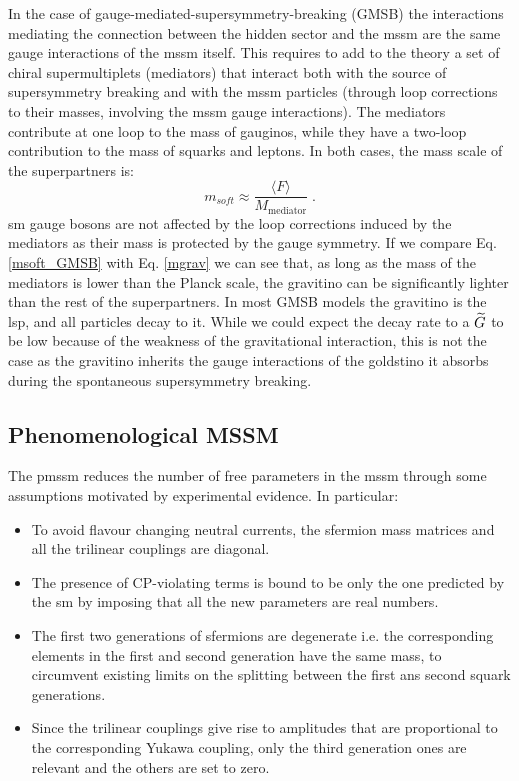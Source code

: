 In the case of gauge-mediated-supersymmetry-breaking (GMSB) \cite{Dine:1981gu, AlvarezGaume:1981wy, Nappi:1982hm, PhysRevD.48.1277, Dine:1994vc, Dine:1995ag} the interactions mediating the connection between the hidden sector and the \gls{mssm} are the same gauge interactions of the \gls{mssm} itself. This requires to add to the theory a set of chiral supermultiplets (mediators) that interact both with the source of supersymmetry breaking and with the \gls{mssm} particles (through loop corrections to their masses, involving the \gls{mssm} gauge interactions). The mediators contribute at one loop to the mass of gauginos, while they have a two-loop contribution to the mass of squarks and leptons. In both cases, the mass scale of the superpartners is:
\begin{equation}
m_{soft} \approx \frac{\langle F \rangle}{M_\mathrm{mediator}} \; .
\label{msoft_GMSB}
\end{equation}
\gls{sm} gauge bosons are not affected by the loop corrections induced by the mediators as their mass is protected by the gauge symmetry.
If we compare Eq. \ref{msoft_GMSB} with Eq. \ref{mgrav} we can see that, as long as the mass of the mediators is lower than the Planck scale, the gravitino can be significantly lighter than the rest of the superpartners. In most GMSB models the gravitino is the \gls{lsp}, and all particles decay to it. While we could expect the decay rate to a $\widetilde{G}$ to be low because of the weakness of the gravitational interaction, this is not the case as the gravitino inherits the gauge interactions of the goldstino it absorbs during the spontaneous supersymmetry breaking.  


\subsection{Phenomenological MSSM}
\label{sec:theory:pmssm}

The \gls{pmssm} \cite{Djouadi:1998di} reduces the number of free parameters in the \gls{mssm} through some assumptions motivated by experimental evidence. In particular:
\begin{itemize}
\item To avoid flavour changing neutral currents, the sfermion mass matrices and all the trilinear couplings are diagonal. 
\item The presence of CP-violating terms is bound to be only the one predicted by the \gls{sm} by imposing that all the new parameters are real numbers.
\item The first two generations of sfermions are degenerate i.e. the corresponding elements in the first and second generation have the same mass, to circumvent existing limits on the splitting between the first ans second squark generations.
\item Since the trilinear couplings give rise to amplitudes that are proportional to the corresponding Yukawa coupling, only the third generation ones are relevant and the others are set to zero.
\end{itemize}

